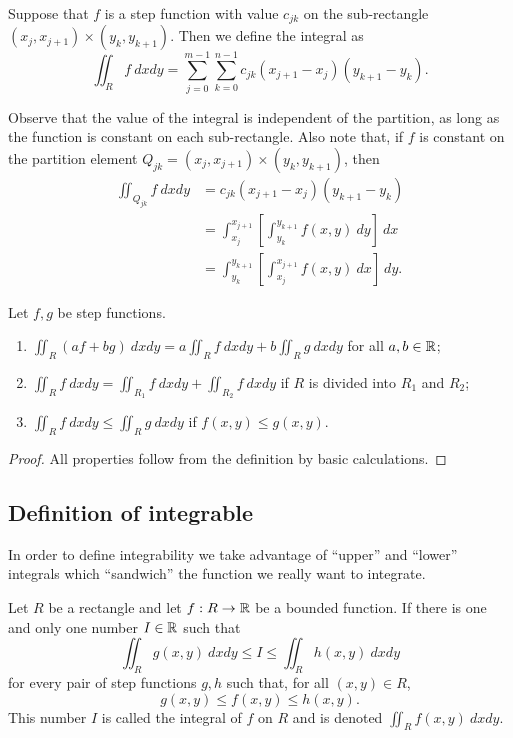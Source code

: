 \begin{definition}
    Suppose that \(f\) is a step function with value \(c_{jk}\) on the sub-rectangle \((x_{j},x_{j+1})\times (y_{k},y_{k+1})\).
    Then we define the integral as
    \[
        \iint_{R} f \ dxdy = \sum_{j=0}^{m-1} \sum_{k=0}^{n-1} c_{jk} (x_{j+1}-x_{j})(y_{k+1}-y_{k}).
    \]
\end{definition}
%
Observe that the value of the integral is independent of the partition, as long as the function is constant on each sub-rectangle.
Also note that, if \(f\) is constant on the partition element \(Q_{jk} = (x_{j},x_{j+1})\times (y_{k},y_{k+1})\), then
\[
    \begin{aligned}
        \iint_{Q_{jk}} f \ dxdy
         & = c_{jk} (x_{j+1}-x_{j})(y_{k+1}-y_{k})                                       \\
         & = \int_{x_j}^{x_{j+1}} \left[\int_{y_k}^{y_{k+1}}f(x,y) \ dy\right] \ dx      \\
         & =  \int_{y_k}^{y_{k+1}} \left[ \int_{x_j}^{x_{j+1}} f(x,y) \ dx \right] \ dy.
    \end{aligned}
\]
%
\begin{theorem}
    Let \(f,g\) be step functions.
    \begin{enumerate}
        \item \(\displaystyle \iint_{R} (a f + b g) \ dxdy = a \displaystyle \iint_{R} f \ dxdy + b \displaystyle\iint_{R} g \ dxdy\) for all \(a,b\in \mathbb{R}\);
        \item \(\displaystyle\iint_{R} f \ dxdy =  \displaystyle\iint_{R_1} f \ dxdy + \displaystyle \iint_{R_2} f \ dxdy\) if \(R\) is divided into \(R_1\) and \(R_2\);
        \item \(\displaystyle\iint_{R} f \ dxdy \leq \displaystyle \iint_{R} g \ dxdy\) if \(f(x,y) \leq g(x,y)\).
    \end{enumerate}
\end{theorem}

\begin{proof}
    All properties follow from the definition by basic calculations.
\end{proof}



\subsection*{Definition of integrable}

In order to define integrability we take advantage of ``upper'' and ``lower'' integrals which ``sandwich'' the function we really want to integrate.
%
\begin{definition}[integrability]
    Let \(R\) be a rectangle and let \(f: R \to \mathbb{R}\) be a bounded function.
    If there is one and only one number \(I\in \mathbb{R}\) such that
    \[
        \iint_{R} g(x,y) \ dxdy \leq I \leq \iint_{R} h(x,y) \ dxdy
    \]
    for every pair of step functions \( g, h\) such that, for all \((x,y)\in R\),
    \[
        g(x,y) \leq f(x,y) \leq h(x,y).
    \]
    This number \(I\) is called the integral of \(f\) on \(R\) and is denoted \(\iint_{R} f(x,y) \ dxdy\).
\end{definition}


